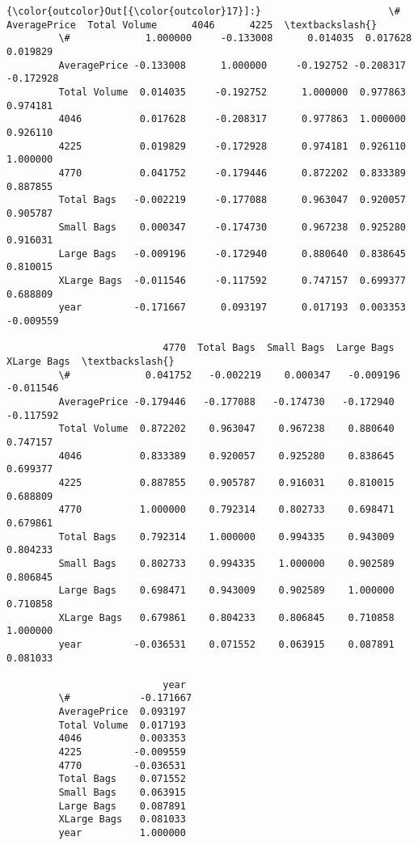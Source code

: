 \documentclass[11pt]{article}
\begin{document}
\begin{Verbatim}[commandchars=\\\{\}]
{\color{outcolor}Out[{\color{outcolor}17}]:}                      \#  AveragePrice  Total Volume      4046      4225  \textbackslash{}
         \#             1.000000     -0.133008      0.014035  0.017628  0.019829   
         AveragePrice -0.133008      1.000000     -0.192752 -0.208317 -0.172928   
         Total Volume  0.014035     -0.192752      1.000000  0.977863  0.974181   
         4046          0.017628     -0.208317      0.977863  1.000000  0.926110   
         4225          0.019829     -0.172928      0.974181  0.926110  1.000000   
         4770          0.041752     -0.179446      0.872202  0.833389  0.887855   
         Total Bags   -0.002219     -0.177088      0.963047  0.920057  0.905787   
         Small Bags    0.000347     -0.174730      0.967238  0.925280  0.916031   
         Large Bags   -0.009196     -0.172940      0.880640  0.838645  0.810015   
         XLarge Bags  -0.011546     -0.117592      0.747157  0.699377  0.688809   
         year         -0.171667      0.093197      0.017193  0.003353 -0.009559   
         
                           4770  Total Bags  Small Bags  Large Bags  XLarge Bags  \textbackslash{}
         \#             0.041752   -0.002219    0.000347   -0.009196    -0.011546   
         AveragePrice -0.179446   -0.177088   -0.174730   -0.172940    -0.117592   
         Total Volume  0.872202    0.963047    0.967238    0.880640     0.747157   
         4046          0.833389    0.920057    0.925280    0.838645     0.699377   
         4225          0.887855    0.905787    0.916031    0.810015     0.688809   
         4770          1.000000    0.792314    0.802733    0.698471     0.679861   
         Total Bags    0.792314    1.000000    0.994335    0.943009     0.804233   
         Small Bags    0.802733    0.994335    1.000000    0.902589     0.806845   
         Large Bags    0.698471    0.943009    0.902589    1.000000     0.710858   
         XLarge Bags   0.679861    0.804233    0.806845    0.710858     1.000000   
         year         -0.036531    0.071552    0.063915    0.087891     0.081033   
         
                           year  
         \#            -0.171667  
         AveragePrice  0.093197  
         Total Volume  0.017193  
         4046          0.003353  
         4225         -0.009559  
         4770         -0.036531  
         Total Bags    0.071552  
         Small Bags    0.063915  
         Large Bags    0.087891  
         XLarge Bags   0.081033  
         year          1.000000  
\end{Verbatim}
            
\end{document}
